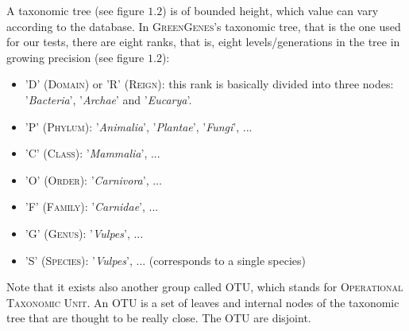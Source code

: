 \documentclass{report}
\begin{document}
A taxonomic tree (see figure $1.2$) is of bounded height, which value can vary according to the database. In \textsc{GreenGenes}'s taxonomic tree, that is the one used for our tests, there are eight ranks, that is, eight levels/generations in the tree in growing precision (see figure $1.2$):
\begin{itemize}
\item 'D' (\textsc{Domain}) or 'R' (\textsc{Reign}): this rank is basically divided into three nodes: '\emph{Bacteria}', '\emph{Archae}' and '\emph{Eucarya}'.
\item 'P' (\textsc{Phylum}): '\emph{Animalia}', '\emph{Plantae}', '\emph{Fungi}', ...
\item 'C' (\textsc{Class}): '\emph{Mammalia}', ...
\item 'O' (\textsc{Order}): '\emph{Carnivora}', ...
\item 'F' (\textsc{Family}): '\emph{Carnidae}', ...
\item 'G' (\textsc{Genus}): '\emph{Vulpes}', ...
\item 'S' (\textsc{Species}): '\emph{Vulpes}', ... (corresponds to a single species)
\end{itemize} 

Note that it exists also another group called OTU, which stands for \textsc{Operational Taxonomic Unit}. An OTU is a set of leaves and internal nodes of the taxonomic tree that are thought to be really close. The OTU are disjoint.\\
\end{document}
